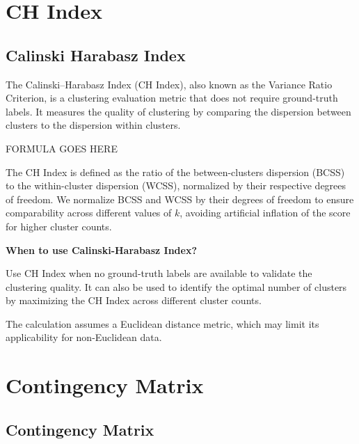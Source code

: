 \clearpage
\thispagestyle{clusteringstyle}
\section{CH Index}
\subsection{Calinski Harabasz Index}

The Calinski–Harabasz Index (CH Index), also known as the Variance Ratio Criterion, is a clustering evaluation metric that does
not require ground-truth labels. It measures the quality of clustering by comparing the dispersion between clusters to the
dispersion within clusters.

\begin{center}
    FORMULA GOES HERE
\end{center}

The CH Index is defined as the ratio of the between-clusters dispersion (BCSS) to the within-cluster dispersion (WCSS),
normalized by their respective degrees of freedom. We normalize BCSS and WCSS by their degrees of freedom to ensure comparability
across different values of $k$, avoiding artificial inflation of the score for higher cluster counts.

\textbf{When to use Calinski-Harabasz Index?}

Use CH Index when no ground-truth labels are available to validate the clustering quality. It can also be used to identify the
optimal number of clusters by maximizing the CH Index across different cluster counts.

{
    \item The calculation assumes a Euclidean distance metric, which may limit its applicability for non-Euclidean data.
}

\clearpage
\thispagestyle{clusteringstyle}
\section{Contingency Matrix}
\subsection{Contingency Matrix}

